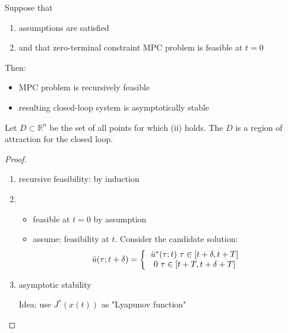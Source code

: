 \begin{Theorem}
Suppose that 
\begin{enumerate}[label=(\roman*)]
\item assumptions are satisfied 
\item and that zero-terminal constraint MPC problem is feasible at $t = 0$
\end{enumerate}
Then: 
\begin{itemize}
\item MPC problem is recursively feasible 
\item resulting closed-loop system is asymptotically stable 
\end{itemize}

Let $D \subset \mathbb{R}^n$ be the set of all points for which (ii) holds. The $D$ is a region of attraction for the closed loop.

\begin{proof}

\begin{enumerate}
\item recursive feasibility: by induction
\item 
\begin{itemize}
\item feasible at $t=0$ by assumption
\item assume: feasibility at $t$. Consider the candidate solution:
\begin{equation*}
\bar u(\tau; t+\delta) =
\left \{
  \begin{tabular}{c}
  $\bar u^*(\tau;t) \ \tau \in [t+\delta, t+ T]$ \\
  $0 \ \tau \in [t+T, t+\delta+T]$ 
  \end{tabular}
  \right.
\end{equation*}
\end{itemize}
\item asymptotic stability

Idea: use $J^*(x(t))$ as "Lyapunov function"


\end{enumerate}
\end{proof}
\end{Theorem}
